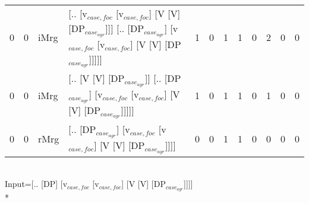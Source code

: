 \begin{tabularx}{\linewidth}{rrlXrrrrrrrr}
   0 &   0 & iMrg & [.. [v$_{case,foc}$ [v$_{case,foc}$] [V [V] [DP$_{case_{agr}}$]]] [.. [DP$_{case_{agr}}$] [v$_{case,foc}$ [v$_{case,foc}$] [V [V] [DP$_{case_{agr}}$]]]]] &            1 &              0 &             1 &             1 &             0 &                  2 &                0 &              0 \\
   0 &   0 & iMrg & [.. [V [V] [DP$_{case_{agr}}$]] [.. [DP$_{case_{agr}}$] [v$_{case,foc}$ [v$_{case,foc}$] [V [V] [DP$_{case_{agr}}$]]]]]                           &            1 &              0 &             1 &             1 &             0 &                  1 &                0 &              0 \\
   0 &   0 & rMrg & [.. [DP$_{case_{agr}}$] [v$_{case,foc}$ [v$_{case,foc}$] [V [V] [DP$_{case_{agr}}$]]]]                                                      &            0 &              0 &             1 &             1 &             0 &                  0 &                0 &              0 \\
\hline
\end{tabularx}\endgroup\\
\begingroup\scriptsize Input=[.. [DP] [v$_{case,foc}$ [v$_{case,foc}$] [V [V] [DP$_{case_{agr}}$]]]]\\*
